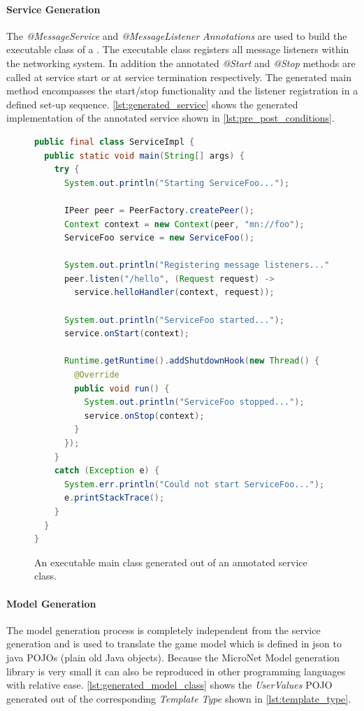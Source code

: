 \paragraph{Service Generation}

The \textit{@MessageService} and \textit{@MessageListener} \textit{Annotations}
are used to build the executable class of a \ms{}. The executable class
registers all message listeners within the networking system. In addition the
annotated \textit{@Start} and \textit{@Stop} methods are called at service start
or at service termination respectively. The generated main method encompasses
the start/stop functionality and the listener registration in a defined set-up
sequence. \autoref{lst:generated_service} shows the generated implementation of
the annotated service shown in \autoref{lst:pre_post_conditions}.

\begin{figure}
\begin{lstlisting}[language=Java,firstnumber=1] 
public final class ServiceImpl {
  public static void main(String[] args) {
    try {
      System.out.println("Starting ServiceFoo...");

      IPeer peer = PeerFactory.createPeer();
      Context context = new Context(peer, "mn://foo");
      ServiceFoo service = new ServiceFoo();

      System.out.println("Registering message listeners...");
      peer.listen("/hello", (Request request) -> 
      	service.helloHandler(context, request));

      System.out.println("ServiceFoo started...");
      service.onStart(context);

      Runtime.getRuntime().addShutdownHook(new Thread() {
        @Override
        public void run() {
          System.out.println("ServiceFoo stopped...");
          service.onStop(context);
        }
      });
    }
    catch (Exception e) {
      System.err.println("Could not start ServiceFoo...");
      e.printStackTrace();
    }
  }
}
\end{lstlisting}
\caption{An executable \ms{} main class generated out of an annotated service
class.}
\label{lst:generated_service}
\end{figure}

\paragraph{Model Generation}

The model generation process is completely independent from the service
generation and is used to translate the game model which is defined in
\gls{json} to java POJOs (plain old Java objects). Because the MicroNet Model
generation library is very small it can also be reproduced in other programming
languages with relative ease. \autoref{lst:generated_model_class} shows the
\textit{UserValues} POJO generated out of the corresponding \textit{Template Type}
shown in \autoref{lst:template_type}.

